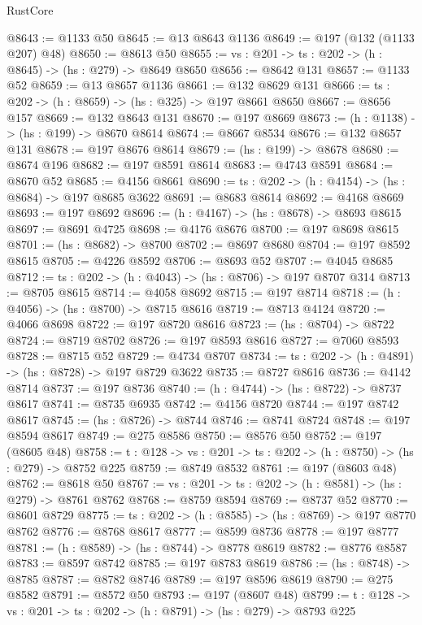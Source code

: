 \begin{lexlean}{RustCore}
\begin{coremodule}
@8643 := @1133 @50
@8645 := @13 @8643 @1136
@8649 := @197 (@132 (@1133 @207) @48)
@8650 := @8613 @50
@8655 := {vs : @201} -> {ts : @202} -> (h : @8645) -> (hs : @279) -> @8649 @8650
@8656 := @8642 @131
@8657 := @1133 @52
@8659 := @13 @8657 @1136
@8661 := @132 @8629 @131
@8666 := {ts : @202} -> (h : @8659) -> (hs : @325) -> @197 @8661 @8650
@8667 := @8656 @157
@8669 := @132 @8643 @131
@8670 := @197 @8669
@8673 := (h : @1138) -> (hs : @199) -> @8670 @8614
@8674 := @8667 @8534
@8676 := @132 @8657 @131
@8678 := @197 @8676 @8614
@8679 := (hs : @199) -> @8678
@8680 := @8674 @196
@8682 := @197 @8591 @8614
@8683 := @4743 @8591
@8684 := @8670 @52
@8685 := @4156 @8661
@8690 := {ts : @202} -> (h : @4154) -> (hs : @8684) -> @197 @8685 @3622
@8691 := @8683 @8614
@8692 := @4168 @8669
@8693 := @197 @8692
@8696 := (h : @4167) -> (hs : @8678) -> @8693 @8615
@8697 := @8691 @4725
@8698 := @4176 @8676
@8700 := @197 @8698 @8615
@8701 := (hs : @8682) -> @8700
@8702 := @8697 @8680
@8704 := @197 @8592 @8615
@8705 := @4226 @8592
@8706 := @8693 @52
@8707 := @4045 @8685
@8712 := {ts : @202} -> (h : @4043) -> (hs : @8706) -> @197 @8707 @314
@8713 := @8705 @8615
@8714 := @4058 @8692
@8715 := @197 @8714
@8718 := (h : @4056) -> (hs : @8700) -> @8715 @8616
@8719 := @8713 @4124
@8720 := @4066 @8698
@8722 := @197 @8720 @8616
@8723 := (hs : @8704) -> @8722
@8724 := @8719 @8702
@8726 := @197 @8593 @8616
@8727 := @7060 @8593
@8728 := @8715 @52
@8729 := @4734 @8707
@8734 := {ts : @202} -> (h : @4891) -> (hs : @8728) -> @197 @8729 @3622
@8735 := @8727 @8616
@8736 := @4142 @8714
@8737 := @197 @8736
@8740 := (h : @4744) -> (hs : @8722) -> @8737 @8617
@8741 := @8735 @6935
@8742 := @4156 @8720
@8744 := @197 @8742 @8617
@8745 := (hs : @8726) -> @8744
@8746 := @8741 @8724
@8748 := @197 @8594 @8617
@8749 := @275 @8586
@8750 := @8576 @50
@8752 := @197 (@8605 @48)
@8758 := {t : @128} -> {vs : @201} -> {ts : @202} -> (h : @8750) -> (hs : @279) -> @8752 @225
@8759 := @8749 @8532
@8761 := @197 (@8603 @48)
@8762 := @8618 @50
@8767 := {vs : @201} -> {ts : @202} -> (h : @8581) -> (hs : @279) -> @8761 @8762
@8768 := @8759 @8594
@8769 := @8737 @52
@8770 := @8601 @8729
@8775 := {ts : @202} -> (h : @8585) -> (hs : @8769) -> @197 @8770 @8762
@8776 := @8768 @8617
@8777 := @8599 @8736
@8778 := @197 @8777
@8781 := (h : @8589) -> (hs : @8744) -> @8778 @8619
@8782 := @8776 @8587
@8783 := @8597 @8742
@8785 := @197 @8783 @8619
@8786 := (hs : @8748) -> @8785
@8787 := @8782 @8746
@8789 := @197 @8596 @8619
@8790 := @275 @8582
@8791 := @8572 @50
@8793 := @197 (@8607 @48)
@8799 := {t : @128} -> {vs : @201} -> {ts : @202} -> (h : @8791) -> (hs : @279) -> @8793 @225

\end{coremodule}
\end{lexlean}
